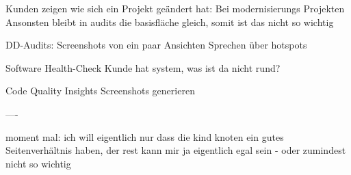 Kunden zeigen wie sich ein Projekt geändert hat:
Bei modernisierungs Projekten 
Ansonsten bleibt in audits die basisfläche gleich, somit ist das nicht so wichtig

DD-Audits: 
Screenshots von ein paar Ansichten
Sprechen über hotspots

Software Health-Check
Kunde hat system, was ist da nicht rund?

Code Quality Insights
Screenshots generieren


----

moment mal: ich will eigentlich nur dass die kind knoten ein gutes Seitenverhältnis haben, der rest kann mir ja eigentlich egal sein - oder zumindest nicht so wichtig